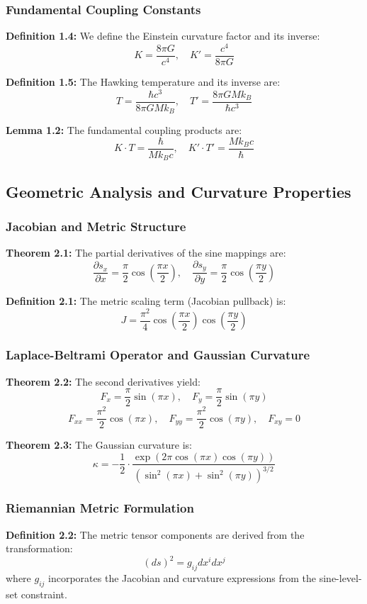 ﻿\documentclass[12pt]{article}
\begin{document}
\subsubsection{Fundamental Coupling Constants}
\textbf{Definition 1.4:} We define the Einstein curvature factor and its inverse:
$$K = \frac{8\pi G}{c^4}, \quad K' = \frac{c^4}{8\pi G}$$

\textbf{Definition 1.5:} The Hawking temperature and its inverse are:
$$T = \frac{\hbar c^3}{8\pi GM k_B}, \quad T' = \frac{8\pi GM k_B}{\hbar c^3}$$

\textbf{Lemma 1.2:} The fundamental coupling products are:
$$K \cdot T = \frac{\hbar}{Mk_B c}, \quad K' \cdot T' = \frac{Mk_B c}{\hbar}$$

\subsection{Geometric Analysis and Curvature Properties}

\subsubsection{Jacobian and Metric Structure}
\textbf{Theorem 2.1:} The partial derivatives of the sine mappings are:
$$\frac{\partial s_x}{\partial x} = \frac{\pi}{2}\cos\left(\frac{\pi x}{2}\right), \quad \frac{\partial s_y}{\partial y} = \frac{\pi}{2}\cos\left(\frac{\pi y}{2}\right)$$

\textbf{Definition 2.1:} The metric scaling term (Jacobian pullback) is:
$$J = \frac{\pi^2}{4}\cos\left(\frac{\pi x}{2}\right)\cos\left(\frac{\pi y}{2}\right)$$

\subsubsection{Laplace-Beltrami Operator and Gaussian Curvature}
\textbf{Theorem 2.2:} The second derivatives yield:
$$F_x = \frac{\pi}{2}\sin(\pi x), \quad F_y = \frac{\pi}{2}\sin(\pi y)$$
$$F_{xx} = \frac{\pi^2}{2}\cos(\pi x), \quad F_{yy} = \frac{\pi^2}{2}\cos(\pi y), \quad F_{xy} = 0$$

\textbf{Theorem 2.3:} The Gaussian curvature is:
$$\kappa = -\frac{1}{2} \cdot \frac{\exp(2\pi \cos(\pi x) \cos(\pi y))}{(\sin^2(\pi x) + \sin^2(\pi y))^{3/2}}$$

\subsubsection{Riemannian Metric Formulation}
\textbf{Definition 2.2:} The metric tensor components are derived from the transformation:
$$(ds)^2 = g_{ij} dx^i dx^j$$
where $g_{ij}$ incorporates the Jacobian and curvature expressions from the sine-level-set constraint.
\end{document}
